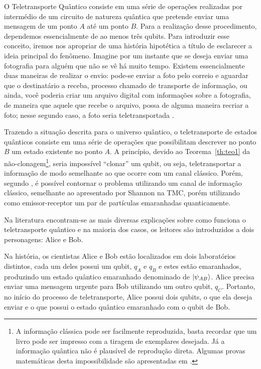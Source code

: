 \documentclass[12pt,oneside,brazil,hidelinks,article,sumario=tradicional,a4paper]{abntex2}
\begin{document}
O Teletransporte Quântico consiste em uma série de operações realizadas por intermédio de um circuito de natureza quântica que pretende enviar uma mensagem de um ponto \(A\) até um ponto \(B\). Para a realização desse procedimento, dependemos essencialmente de ao menos três qubits. Para introduzir esse conceito, iremos nos apropriar de uma história hipotética a título de esclarecer a ideia principal do fenômeno. Imagine por um instante que se deseja enviar uma fotografia para alguém que não se vê há muito tempo. Existem essencialmente duas maneiras de realizar o envio: pode-se enviar a foto pelo correio e aguardar que o destinatário a receba, processo chamado de transporte de informação, ou ainda, você poderia criar um arquivo digital com informações sobre a fotografia, de maneira que aquele que recebe o arquivo, possa de alguma maneira recriar a foto; nesse segundo caso, a foto seria teletransportada \cite{materialdidaticomecquantica}.

Trazendo a situação descrita para o universo quântico, o teletransporte de estados quânticos consiste em uma série de operações que possibilitam descrever no ponto \(B\) um estado existente no ponto \(A\). A princípio, devido ao Teorema~\ref{th:teo1} da não-clonagem\footnote{A informação clássica pode ser facilmente reproduzida, basta recordar que um livro pode ser impresso com a tiragem de exemplares desejada. Já a informação quântica não é plausível de reprodução direta. Algumas provas matemáticas desta impossibilidade são apresentadas em \textcite{TeoQuanInfoEntreCopia}.}, seria impossível ``clonar'' um qubit, ou seja, teletransportar a informação de modo semelhante ao que ocorre com um canal clássico. Porém, segundo \textcite{bennet}, é possível contornar o problema utilizando um canal de informação clássico, semelhante ao apresentado por Shannon na TMC, porém utilizando como emissor-receptor um par de partículas emaranhadas quanticamente.

Na literatura encontram-se as mais diversas explicações sobre como funciona o teletransporte quântico \cites{bennet}{experimentalqt}{zeilinger}{brassard1996teleportation}{materialdidaticomecquantica} e na maioria dos casos, os leitores são introduzidos a dois personagens: Alice e Bob.

Na história, os cientistas Alice e Bob estão localizados em dois laboratórios distintos, cada um deles possui um qubit, $q_{A}$ e $q_{B}$ e estes estão emaranhados, produzindo um estado quântico emaranhado denominado de $\ket{\psi_{AB}}$. Alice precisa enviar uma mensagem urgente para Bob utilizando um outro qubit, $q_{C}$. Portanto, no início do processo de teletransporte, Alice possui dois qubits, o que ela deseja enviar e o que possui o estado quântico emaranhado com o qubit de Bob.
\end{document}
